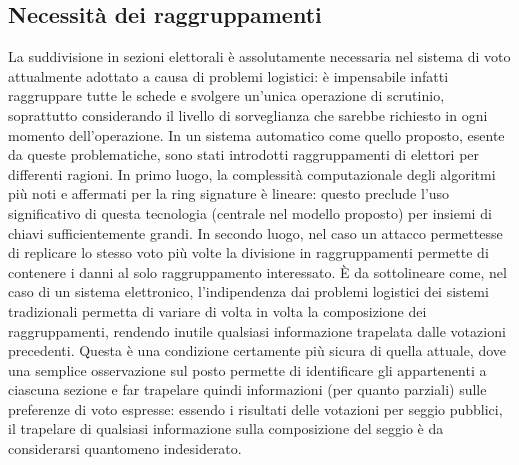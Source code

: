 	\subsection{Necessità dei raggruppamenti}
		La suddivisione in sezioni elettorali è assolutamente necessaria nel sistema di voto attualmente adottato a causa di problemi logistici: è impensabile infatti raggruppare tutte le schede e svolgere un'unica operazione di scrutinio, soprattutto considerando il livello di sorveglianza che sarebbe richiesto in ogni momento dell'operazione. In un sistema automatico come quello proposto, esente da queste problematiche, sono stati introdotti raggruppamenti di elettori per differenti ragioni. In primo luogo, la complessità computazionale degli algoritmi più noti e affermati per la ring signature è lineare: questo preclude l'uso significativo di questa tecnologia (centrale nel modello proposto) per insiemi di chiavi sufficientemente grandi. In secondo luogo, nel caso un attacco permettesse di replicare lo stesso voto più volte la divisione in raggruppamenti permette di contenere i danni al solo raggruppamento interessato.
		È da sottolineare come, nel caso di un sistema elettronico, l'indipendenza dai problemi logistici dei sistemi tradizionali permetta di variare di volta in volta la composizione dei raggruppamenti, rendendo inutile qualsiasi informazione trapelata dalle votazioni precedenti. Questa è una condizione certamente più sicura di quella attuale, dove una semplice osservazione sul posto permette di identificare gli appartenenti a ciascuna sezione e far trapelare quindi informazioni (per quanto parziali) sulle preferenze di voto espresse: essendo i risultati delle votazioni per seggio pubblici, il trapelare di qualsiasi informazione sulla composizione del seggio è da considerarsi quantomeno indesiderato.
	
